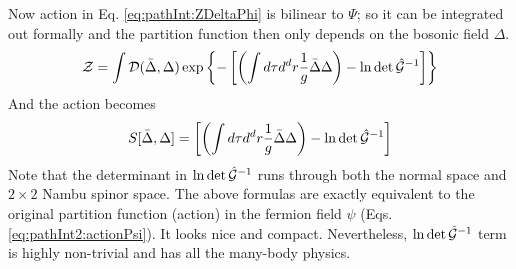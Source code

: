 Now action in Eq. \ref{eq:pathInt:ZDeltaPhi} is bilinear to $\Psi$; so it can be integrated out formally and the partition function then only depends on the bosonic field $\Delta$.  
\begin{equation}\label{eq:pathInt:DeltaPF}
\mathcal{Z}=\int{\ensuremath{\mathcal{D}}(\bar\Delta,\Delta)}\exp
	\left\{-\left[\left(\int{d\tau{d^{d}r}}\frac{1}{g}{\bar\Delta\Delta}\right)-\ln\det\hat{\mathcal{G}}^{-1}\right]\right\}
\end{equation}
And the action becomes
\begin{equation}\label{eq:pathInt:DeltaAction}
S[\bar\Delta,\Delta]=
	{\left[\left(\int{d\tau{d^{d}r}}\frac{1}{g}{\bar\Delta\Delta}\right)-\ln\det\hat{\mathcal{G}}^{-1}\right]}
\end{equation}
Note that the determinant in $\ln\det\hat{\mathcal{G}}^{-1}$ runs through both the normal space and $2\times2$ Nambu spinor space.  The above formulas are exactly equivalent to the original partition function (action) in the fermion field $\psi$ (Eqs. \ref{eq:pathInt2:actionPsi}). It looks nice and compact. Nevertheless, $\ln\det\hat{\mathcal{G}}^{-1}$ term is highly non-trivial and has all the many-body physics.

